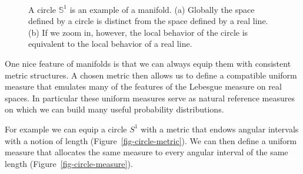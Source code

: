 \documentclass[
  letterpaper,
  DIV=11,
  numbers=noendperiod]{scrartcl}
\begin{document}
\begin{figure}
\begin{minipage}[t]{0.60\linewidth}
{{}

}

\subcaption{\label{fig-circle-close}}
\end{minipage}%
%
\begin{minipage}[t]{0.20\linewidth}

{\centering 

~

}

\end{minipage}%

\caption{\label{fig-circle}A circle \(\mathbb{S}^{1}\) is an example of
a manifold. (a) Globally the space defined by a circle is distinct from
the space defined by a real line. (b) If we zoom in, however, the local
behavior of the circle is equivalent to the local behavior of a real
line.}

\end{figure}

One nice feature of manifolds is that we can always equip them with
consistent metric structures. A chosen metric then allows us to define a
compatible uniform measure that emulates many of the features of the
Lebesgue measure on real spaces. In particular these uniform measures
serve as natural reference measures on which we can build many useful
probability distributions.

For example we can equip a circle \(S^{1}\) with a metric that endows
angular intervals with a notion of length
(Figure~\ref{fig-circle-metric}). We can then define a uniform measure
that allocates the same measure to every angular interval of the same
length (Figure~\ref{fig-circle-measure}).
\end{document}
